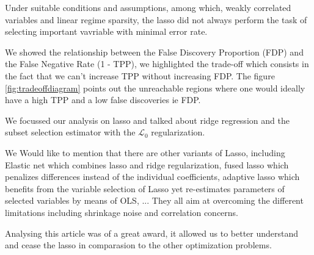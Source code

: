 \documentclass[10pt,onecolumn,letterpaper]{article}
\begin{document}
Under suitable conditions and assumptions, among which, weakly correlated variables and linear regime sparsity, the lasso did not always perform the task of selecting important vavriable with minimal error rate.
\newline 

We showed the relationship between the False Discovery Proportion (FDP) and the False Negative Rate (1 - TPP), we highlighted the trade-off which consists in the fact that we can't increase TPP without increasing FDP. The figure \ref{fig:tradeoffdiagram} points out the unreachable regions where one would ideally have a high TPP and a low false discoveries ie FDP.
\newline 

We focussed our analysis on lasso and talked about ridge regression and the subset selection estimator with the $\mathcal{L}_0$ regularization. 

We Would like to mention that there are other variants of Lasso, including Elastic net which combines lasso and ridge regularization, fused lasso which penalizes differences instead of the individual coefficients, adaptive lasso which benefits from the variable selection of Lasso yet re-estimates parameters of selected variables by means of OLS, ... They all aim at overcoming the different limitations including shrinkage noise and correlation concerns.
\newline

Analysing this article was of a great award, it allowed us to better understand and cease the lasso in comparasion to the other optimization problems. 
\end{document}

